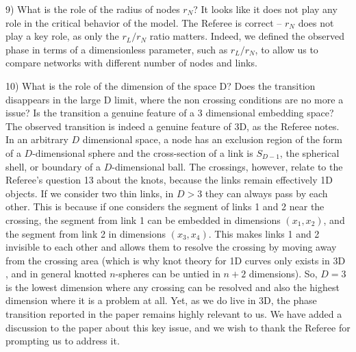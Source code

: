 \documentclass[11pt]{article}
\begin{document}
\begin{response}{
9) What is the role of the radius of nodes $r_N$? It looks like it does not play any role in the critical behavior of the model. 
}
The Referee is correct -- $r_N$ does not play a key role, as only the $r_L/r_N$ ratio matters.
Indeed, we defined the observed phase in terms of a dimensionless parameter, such as $r_L/r_N$, to allow us to compare networks with different number of nodes and links. 

\end{response}
\begin{response}{
10) What is the role of the dimension of the space D? Does the transition disappears in the large D limit, where the non crossing conditions are no more a issue? Is the transition a genuine feature of a 3 dimensional embedding space?
}
The observed transition is indeed a genuine feature of 3D,
as the Referee notes. 
In an arbitrary $D$ dimensional space, a node has an exclusion region of the form of a $D$-dimensional sphere and the cross-section of a link is $S_{D-1}$, the spherical shell, or boundary of a $D$-dimensional ball. 
The crossings, however, relate to the Referee's question 13 about the knots, because the links remain effectively 1D objects.
If we consider two thin links, in $D>3$ they can always pass by each other. 
This is because if one considers the segment of links 1 and 2 near the crossing, the segment from link 1 can be embedded in dimensions $(x_1,x_2)$, and the segment from link 2 in dimensions $(x_3,x_4)$. 
This makes links 1 and 2 invisible to each other and allows them to resolve the crossing by moving away from the crossing area (which is why knot theory for 1D curves only exists in 3D \cite{zeeman1963unknotting}, and in general knotted $n$-spheres can be untied in $n+2$ dimensions). 
So, $D=3$ is the lowest dimension where any crossing can be resolved and also the highest dimension where it is a problem at all.
Yet, as we do live in 3D, the phase transition reported in the paper remains highly relevant to us. 
We have added a discussion to the paper about this key issue, and we wish to thank the Referee for prompting us to address it. 
\end{response}
\end{document}
